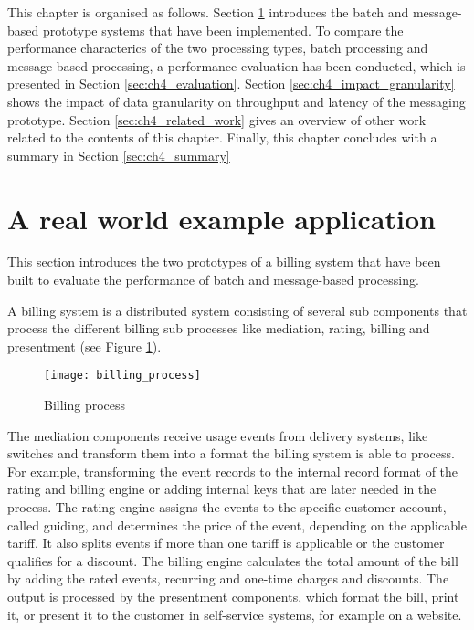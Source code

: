 This chapter is organised as follows. Section \ref{sec:ch4_prototype} introduces the batch and message-based prototype systems that have been implemented. To compare the performance characterics of the two processing types, batch processing and message-based processing, a performance evaluation has been conducted, which is presented in Section \ref{sec:ch4_evaluation}. Section \ref{sec:ch4_impact_granularity} shows the impact of data granularity on throughput and latency of the messaging prototype. Section \ref{sec:ch4_related_work} gives an overview of other work related to the contents of this chapter. Finally, this chapter concludes with a summary in Section \ref{sec:ch4_summary} 

\section{A real world example  application}\label{sec:ch4_prototype}
This section introduces the two prototypes of a billing system that have been built to evaluate the performance of batch and message-based processing.

A billing system is a distributed system consisting of several sub components that process the different billing sub processes like mediation, rating, billing and presentment (see Figure \ref{fig:ch4_billing_process}).



\begin{figure}[htbp]
	\centering
	\texttt{[image: billing\_process]}
	\caption{Billing process}
	\label{fig:ch4_billing_process}
\end{figure}

The mediation components receive usage events from delivery systems, like switches and transform them into a format the billing system is able to process. For example, transforming the event records to the internal record format of the rating and billing engine or adding internal keys that are later needed in the process. The rating engine assigns the events to the specific customer account, called guiding, and determines the price of the event, depending on the applicable tariff. It also splits events if more than one tariff is applicable or the customer qualifies for a discount. The billing engine calculates the total amount of the bill by adding the rated events, recurring and one-time charges and discounts. The output is processed by the presentment components, which format the bill, print it, or present it to the customer in self-service systems, for example on a website.

